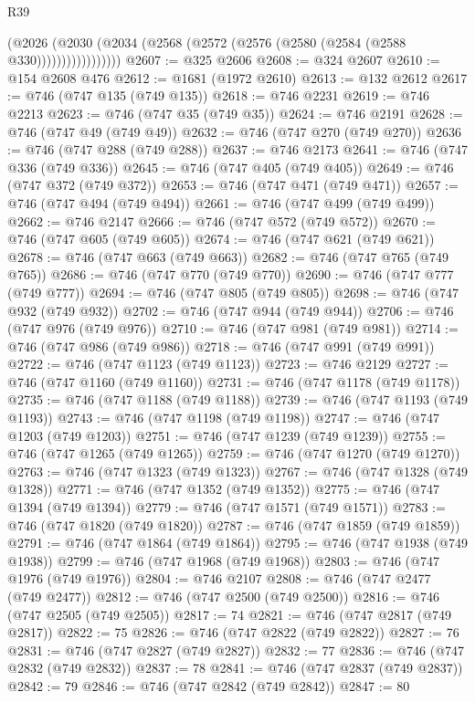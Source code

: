 \begin{lexlean}{R39}
\begin{coremodule}
                    (@2026
                      (@2030 (@2034 (@2568 (@2572 (@2576 (@2580 (@2584 (@2588 @330)))))))))))))))))
@2607 := @325 @2606
@2608 := @324 @2607
@2610 := @154 @2608 @476
@2612 := @1681 (@1972 @2610)
@2613 := @132 @2612
@2617 := @746 (@747 @135 (@749 @135))
@2618 := @746 @2231
@2619 := @746 @2213
@2623 := @746 (@747 @35 (@749 @35))
@2624 := @746 @2191
@2628 := @746 (@747 @49 (@749 @49))
@2632 := @746 (@747 @270 (@749 @270))
@2636 := @746 (@747 @288 (@749 @288))
@2637 := @746 @2173
@2641 := @746 (@747 @336 (@749 @336))
@2645 := @746 (@747 @405 (@749 @405))
@2649 := @746 (@747 @372 (@749 @372))
@2653 := @746 (@747 @471 (@749 @471))
@2657 := @746 (@747 @494 (@749 @494))
@2661 := @746 (@747 @499 (@749 @499))
@2662 := @746 @2147
@2666 := @746 (@747 @572 (@749 @572))
@2670 := @746 (@747 @605 (@749 @605))
@2674 := @746 (@747 @621 (@749 @621))
@2678 := @746 (@747 @663 (@749 @663))
@2682 := @746 (@747 @765 (@749 @765))
@2686 := @746 (@747 @770 (@749 @770))
@2690 := @746 (@747 @777 (@749 @777))
@2694 := @746 (@747 @805 (@749 @805))
@2698 := @746 (@747 @932 (@749 @932))
@2702 := @746 (@747 @944 (@749 @944))
@2706 := @746 (@747 @976 (@749 @976))
@2710 := @746 (@747 @981 (@749 @981))
@2714 := @746 (@747 @986 (@749 @986))
@2718 := @746 (@747 @991 (@749 @991))
@2722 := @746 (@747 @1123 (@749 @1123))
@2723 := @746 @2129
@2727 := @746 (@747 @1160 (@749 @1160))
@2731 := @746 (@747 @1178 (@749 @1178))
@2735 := @746 (@747 @1188 (@749 @1188))
@2739 := @746 (@747 @1193 (@749 @1193))
@2743 := @746 (@747 @1198 (@749 @1198))
@2747 := @746 (@747 @1203 (@749 @1203))
@2751 := @746 (@747 @1239 (@749 @1239))
@2755 := @746 (@747 @1265 (@749 @1265))
@2759 := @746 (@747 @1270 (@749 @1270))
@2763 := @746 (@747 @1323 (@749 @1323))
@2767 := @746 (@747 @1328 (@749 @1328))
@2771 := @746 (@747 @1352 (@749 @1352))
@2775 := @746 (@747 @1394 (@749 @1394))
@2779 := @746 (@747 @1571 (@749 @1571))
@2783 := @746 (@747 @1820 (@749 @1820))
@2787 := @746 (@747 @1859 (@749 @1859))
@2791 := @746 (@747 @1864 (@749 @1864))
@2795 := @746 (@747 @1938 (@749 @1938))
@2799 := @746 (@747 @1968 (@749 @1968))
@2803 := @746 (@747 @1976 (@749 @1976))
@2804 := @746 @2107
@2808 := @746 (@747 @2477 (@749 @2477))
@2812 := @746 (@747 @2500 (@749 @2500))
@2816 := @746 (@747 @2505 (@749 @2505))
@2817 := 74
@2821 := @746 (@747 @2817 (@749 @2817))
@2822 := 75
@2826 := @746 (@747 @2822 (@749 @2822))
@2827 := 76
@2831 := @746 (@747 @2827 (@749 @2827))
@2832 := 77
@2836 := @746 (@747 @2832 (@749 @2832))
@2837 := 78
@2841 := @746 (@747 @2837 (@749 @2837))
@2842 := 79
@2846 := @746 (@747 @2842 (@749 @2842))
@2847 := 80

\end{coremodule}
\end{lexlean}

